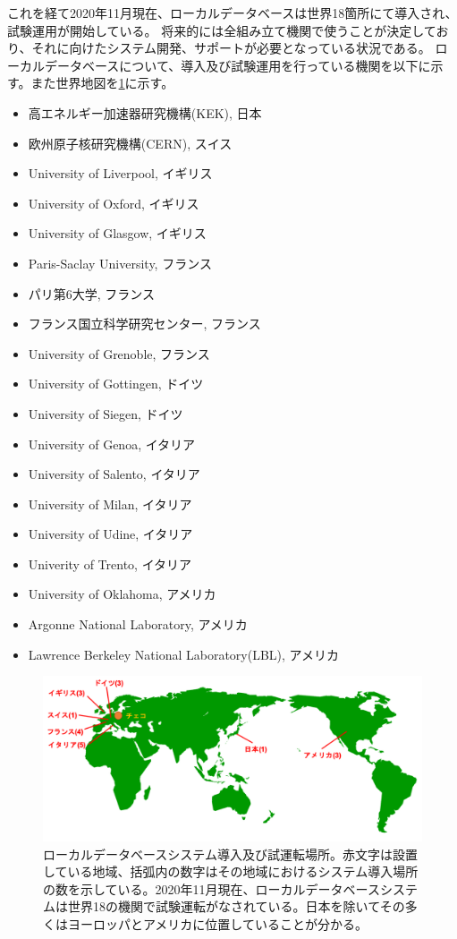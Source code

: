 これを経て2020年11月現在、ローカルデータベースは世界18箇所にて導入され、試験運用が開始している。
将来的には全組み立て機関で使うことが決定しており、それに向けたシステム開発、サポートが必要となっている状況である。
ローカルデータベースについて、導入及び試験運用を行っている機関を以下に示す。また世界地図を\ref{localdb_world_map}に示す。

\begin{itemize}
  \item 高エネルギー加速器研究機構(KEK), 日本
  \item 欧州原子核研究機構(CERN), スイス
  \item University of Liverpool, イギリス
  \item University of Oxford, イギリス
  \item University of Glasgow, イギリス
  \item Paris-Saclay University, フランス
  \item パリ第6大学, フランス
  \item フランス国立科学研究センター, フランス
  \item University of Grenoble, フランス
  \item University of Gottingen, ドイツ
  \item University of Siegen, ドイツ
  \item University of Genoa, イタリア
  \item University of Salento, イタリア
  \item University of Milan, イタリア
  \item University of Udine, イタリア
  \item Univerity of Trento, イタリア
  \item University of Oklahoma, アメリカ
  \item Argonne National Laboratory, アメリカ
  \item Lawrence Berkeley National Laboratory(LBL), アメリカ
\end{itemize}

\begin{figure}[bpt]\centering
\includegraphics[width=14cm]{./localdb_world_map.png}
\caption[ローカルデータベースシステム導入及び試運転場所]{ローカルデータベースシステム導入及び試運転場所。赤文字は設置している地域、括弧内の数字はその地域におけるシステム導入場所の数を示している。2020年11月現在、ローカルデータベースシステムは世界18の機関で試験運転がなされている。日本を除いてその多くはヨーロッパとアメリカに位置していることが分かる。}
\label{localdb_world_map}
\end{figure}



